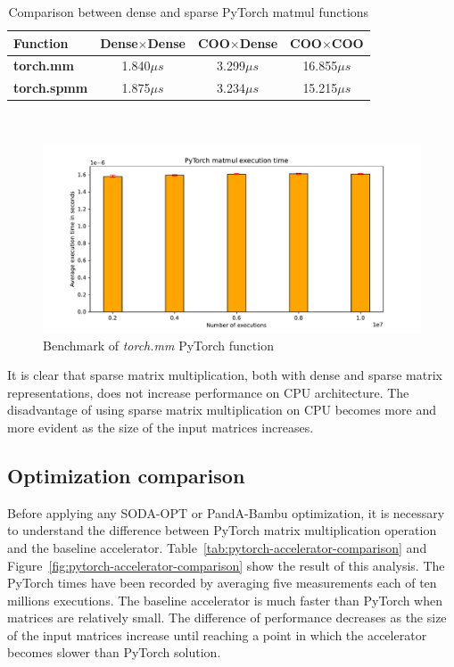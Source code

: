 \begin{table}[t]
\centering
    \begin{tabular}{|p{6em} c c c |}
    \hline
    \textbf{Function} & \textbf{Dense$\times$Dense} & \textbf{COO$\times$Dense} & \textbf{COO$\times$COO} \T\B \\
    \hline \hline
    \textbf{torch.mm} & 1.840$\mu s$  & 3.299$\mu s$ & 16.855$\mu s$ \T\B\\
    \hline
    \textbf{torch.spmm} & 1.875$\mu s$  & 3.234$\mu s$ & 15.215$\mu s$ \T\B\\
    \hline
    \end{tabular}
    \\[10pt]
    \caption{Comparison between dense and sparse PyTorch matmul functions}
    \label{tab:torch-matmul-comparison}
\end{table}

\begin{figure}[t]
    \centering
    \includegraphics[height=0.4\textwidth]{Images/torch-mm_benchmark}
    \caption{Benchmark of \textit{torch.mm} PyTorch function}
    \label{fig:torch-mm_benchmark}
\end{figure}

It is clear that sparse matrix multiplication, both with dense and sparse matrix representations, does not increase performance on CPU architecture.
The disadvantage of using sparse matrix multiplication on CPU becomes more and more evident as the size of the input matrices increases.

\subsection{Optimization comparison}
\label{subsec:optimization-comparison}%

Before applying any SODA-OPT or PandA-Bambu optimization, it is necessary to understand the difference between PyTorch matrix multiplication operation and the baseline accelerator.
Table~\ref{tab:pytorch-accelerator-comparison} and Figure~\ref{fig:pytorch-accelerator-comparison} show the result of this analysis.
The PyTorch times have been recorded by averaging five measurements each of ten millions executions.
The baseline accelerator is much faster than PyTorch when matrices are relatively small.
The difference of performance decreases as the size of the input matrices increase until reaching a point in which the accelerator becomes slower than PyTorch solution.

